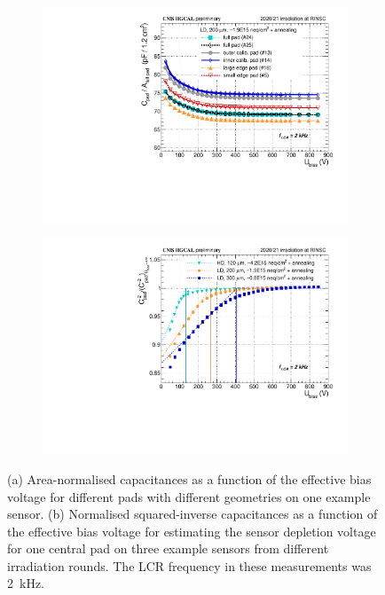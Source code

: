 \begin{figure}
	\captionsetup[subfigure]{aboveskip=-1pt,belowskip=-1pt}
	\centering
	\begin{subfigure}[b]{0.49\textwidth}
		\includegraphics[width=0.999\textwidth]{plots/channel_cv/channel_CV_sensors_channels.pdf}
		\subcaption{
		}
		\label{plot:pad_CV_channels}
	\end{subfigure}
	\hfill
	\begin{subfigure}[b]{0.49\textwidth}
		\includegraphics[width=0.999\textwidth]{plots/channel_cv/channel_invCV_sensors_sensors.pdf}
		\subcaption{
		}
		\label{plot:pad_invCV_sensor}
	\end{subfigure}
	\caption{
		(a) Area-normalised capacitances as a function of the effective bias voltage for different pads with different geometries on one example sensor.
		(b) Normalised squared-inverse capacitances as a function of the effective bias voltage for estimating the sensor depletion voltage for one central pad on three example sensors from different irradiation rounds.
		The LCR frequency in these measurements was \SI{2}{\kilo\hertz}.
	}
\end{figure}

